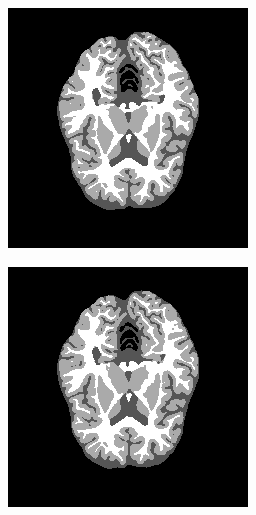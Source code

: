 \documentclass[varwidth=true, border=10pt, convert={size=640x}]{standalone}
\begin{document}
\begin{figure}
 \centering
 \begin{subfigure}[b]{.32\textwidth}
 \includegraphics[width=.98\linewidth]{./images/lstmfeas_new_new.png}
 \end{subfigure}
  \begin{subfigure}[b]{.32\textwidth}
 \includegraphics[width=.98\linewidth]{./images/grusfeas_new_new.png}

\end{subfigure}
\end{figure}
\end{document}
